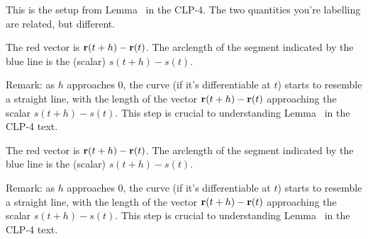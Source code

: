 \begin{hint}
This is the setup from Lemma~ in the CLP-4. 
The two quantities you're labelling are related, but different.
\end{hint}
\begin{answer}

\begin{center}
\end{center}
The red vector is $\mathbf{r}(t+h)-\mathbf{r}(t)$. The arclength of the segment indicated by the blue line is the (scalar) $s(t+h)-s(t)$.

Remark: as $h$ approaches 0, the curve (if it's differentiable at $t$) starts to resemble a straight line, with the length of the vector $\mathbf{r}(t+h)-\mathbf{r}(t)$ approaching the scalar $s(t+h)-s(t)$. This step is crucial to understanding Lemma~ in the CLP-4 text. 
\end{answer}
\begin{solution}

\begin{center}
\end{center}
The red vector is $\mathbf{r}(t+h)-\mathbf{r}(t)$. The arclength of the segment indicated by the blue line is the (scalar) $s(t+h)-s(t)$.

Remark: as $h$ approaches 0, the curve (if it's differentiable at $t$) starts to resemble a straight line, with the length of the vector $\mathbf{r}(t+h)-\mathbf{r}(t)$ approaching the scalar $s(t+h)-s(t)$. This step is crucial to understanding Lemma~  in the CLP-4 text. 

\end{solution}
